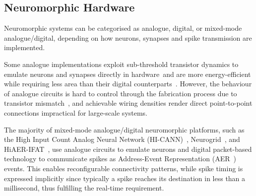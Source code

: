 \subsection{Neuromorphic Hardware}
\label{subsec:neuromorphic_hw}
Neuromorphic systems can be categorised as analogue, digital, or mixed-mode analogue/digital, depending on how neurons, synapses and spike transmission are implemented. %

Some analogue implementations exploit sub-threshold transistor dynamics to emulate neurons and synapses directly in hardware~\DIFdelbegin {}\DIFdelend \DIFaddbegin {}\DIFaddend and are more energy-efficient while requiring less area than their digital counterparts~\DIFdelbegin {}\DIFdelend \DIFaddbegin {}\DIFaddend .
However, the behaviour of analogue circuits is hard to control through the fabrication process due to transistor mismatch~\DIFdelbegin {}\DIFdelend \DIFaddbegin {}\DIFaddend , and achievable \DIFdelbegin {}\DIFdelend wiring densities render direct point-to-point connections impractical for large-scale systems.

The majority of mixed-mode analogue/digital neuromorphic platforms, such as the High Input Count Analog Neural Network (HI-CANN)~\DIFdelbegin {}\DIFdelend \DIFaddbegin {}\DIFaddend , Neurogrid~\DIFdelbegin {}\DIFdelend \DIFaddbegin {}\DIFaddend , and HiAER-IFAT~\DIFdelbegin {}\DIFdelend \DIFaddbegin {}\DIFaddend , use analogue circuits to emulate neurons and digital packet-based technology to communicate spikes as Address-Event Representation (AER~\DIFdelbegin {}\DIFdelend \DIFaddbegin {}\DIFaddend ) events.
This enables reconfigurable connectivity patterns, while spike timing is expressed implicitly since typically a spike reaches its destination in less than a millisecond, thus fulfilling the real-time requirement.

